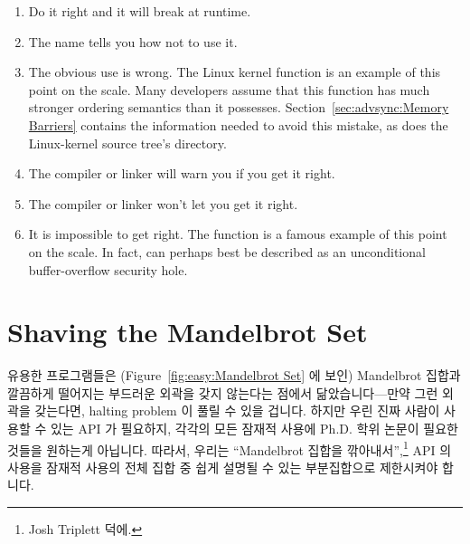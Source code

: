 \begin{enumerate}
\item	Do it right and it will break at runtime.
\item	The name tells you how not to use it.
\item	The obvious use is wrong.
	The Linux kernel  function is an example of
	this point on the scale.
	Many developers assume that this function has much
	stronger ordering semantics than it possesses.
	Section~\ref{sec:advsync:Memory Barriers} contains the
	information needed to avoid this mistake, as does the
	Linux-kernel source tree's  directory.
\item	The compiler or linker will warn you if you get it right.
\item	The compiler or linker won't let you get it right.
\item	It is impossible to get right.
	The  function is a famous example of this point on
	the scale.
	In fact,  can perhaps best be described as
	an unconditional buffer-overflow security hole.
\fi
\end{enumerate}

\section{Shaving the Mandelbrot Set}
\label{sec:easy:Shaving the Mandelbrot Set}

유용한 프로그램들은
(Figure~\ref{fig:easy:Mandelbrot Set} 에 보인) Mandelbrot 집합과 깔끔하게
떨어지는 부드러운 외곽을 갖지 않는다는 점에서 닮았습니다---만약 그런 외곽을
갖는다면, halting problem 이 풀릴 수 있을 겁니다.
하지만 우린 진짜 사람이 사용할 수 있는 API 가 필요하지, 각각의 모든 잠재적
사용에 Ph.D. 학위 논문이 필요한 것들을 원하는게 아닙니다.
따라서, 우리는 ``Mandelbrot 집합을 깎아내서'',\footnote{
	Josh Triplett 덕에.}
API 의 사용을 잠재적 사용의 전체 집합 중 쉽게 설명될 수 있는 부분집합으로
제한시켜야 합니다.

